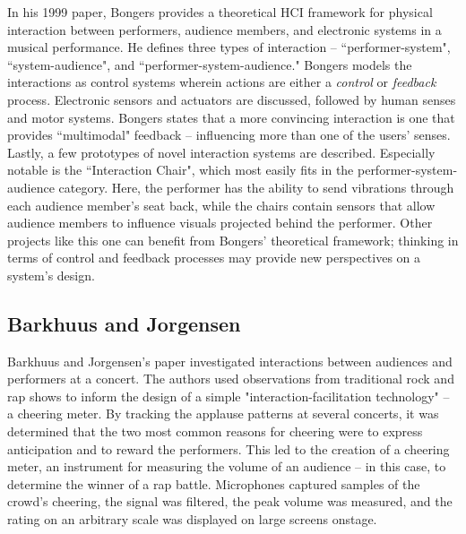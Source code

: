 In his 1999 paper, Bongers provides a theoretical HCI framework for physical interaction between performers, audience members, and electronic systems in a musical performance. He defines three types of interaction -- ``performer-system", ``system-audience", and ``performer-system-audience." Bongers models the interactions as control systems wherein actions are either a \emph{control} or \emph{feedback} process. Electronic sensors and actuators are discussed, followed by human senses and motor systems. Bongers states that a more convincing interaction is one that provides ``multimodal" feedback -- influencing more than one of the users' senses. Lastly, a few prototypes of novel interaction systems are described. Especially notable is the ``Interaction Chair", which most easily fits in the performer-system-audience category. Here, the performer has the ability to send vibrations through each audience member's seat back, while the chairs contain sensors that allow audience members to influence visuals projected behind the performer. Other projects like this one can benefit from Bongers' theoretical framework; thinking in terms of control and feedback processes may provide new perspectives on a  system's design.

\subsection{Barkhuus and Jorgensen}

Barkhuus and Jorgensen's paper investigated interactions between audiences and performers at a concert. The authors used observations from traditional rock and rap shows to inform the design of a simple "interaction-facilitation technology" -- a cheering meter. By tracking the applause patterns at several concerts, it was determined that the two most common reasons for cheering were to express anticipation and to reward the performers. This led to the creation of a cheering meter, an instrument for measuring the volume of an audience -- in this case, to determine the winner of a rap battle. Microphones captured samples of the crowd's cheering, the signal was filtered, the peak volume was measured, and the rating on an arbitrary scale was displayed on large screens onstage.

